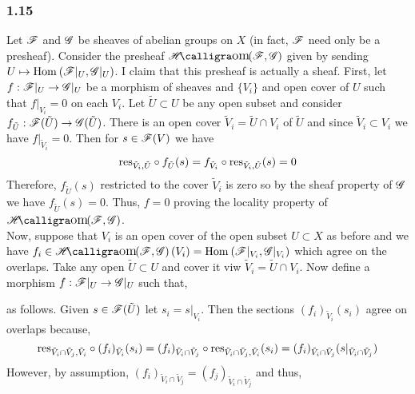\documentclass[12pt]{article}
\begin{document}
\subsubsection{1.15}

Let $\mathscr{F}$ and $\mathscr{G}$ be sheaves of abelian groups on $X$ (in fact, $\mathscr{F}$ need only be a presheaf). Consider the presheaf $\shHom{}{\F}{\G}$ given by sending $U \mapsto \text{Hom}_{}\left( \mathscr{F}|_U, \mathscr{G}|_U \right)$. I claim that this presheaf is actually a sheaf. First, let $f : \mathscr{F}|_U \to \mathscr{G}|_U$ be a morphism of sheaves and $\{ V_i \}$ and open cover of $U$ such that $f|_{V_i} = 0$ on each $V_i$. Let $\tilde{U} \subset U$ be any open subset and consider $f_{\tilde{U}} : \mathscr{F}(\tilde{U}) \to \mathscr{G}(\tilde{U})$. There is an open cover $\tilde{V}_i = \tilde{U} \cap V_i$ of $\tilde{U}$ and since $\tilde{V}_i \subset V_i$ we have $f|_{\tilde{V}_i} = 0$. Then for $s \in \mathscr{F}(V)$ we have \[ \mathrm{res}_{\tilde{V}_i, \tilde{U}} \circ f_{\tilde{U}}(s) = f_{\tilde{V}_i} \circ \mathrm{res}_{\tilde{V}_i, \tilde{U}}(s) = 0 \]
Therefore, $f_{\tilde{U}}(s)$ restricted to the cover $\tilde{V}_i$ is zero so by the sheaf property of $\mathscr{G}$ we have $f_{\tilde{U}}(s) = 0$. Thus, $f = 0$ proving the locality property of $\shHom{}{\F}{\G}$. 
\bigskip\\
Now, suppose that $V_i$ is an open cover of the open subset $U \subset X$ as before and we have $f_i \in \shHom{}{\F}{\G}(V_i) = \Hom{}{\F|_{V_i}}{\G|_{V_i}}$ which agree on the overlaps. Take any open $\tilde{U} \subset U$ and cover it viw $\tilde{V}_i = \tilde{U} \cap V_i$. Now define a morphism $f : \mathscr{F}|_U \to \mathscr{G}|_U$ such that,
\begin{center}
\end{center}
as follows. Given $s \in \mathscr{F}(\tilde{U})$ let $s_i = s |_{V_i}$. Then the sections $(f_i)_{\tilde{V}_i}(s_i)$ agree on overlaps because,
\[ \mathrm{res}_{\tilde{V}_i \cap \tilde{V}_j, \tilde{V}_i} \circ (f_i)_{\tilde{V}_i}(s_i) = (f_i)_{\tilde{V}_i \cap \tilde{V}_j} \circ \mathrm{res}_{\tilde{V}_i \cap \tilde{V}_j, \tilde{V}_i}(s_i) = (f_i)_{\tilde{V}_i \cap \tilde{V}_j}(s |_{\tilde{V}_i \cap \tilde{V}_j}) \]
However, by assumption, $(f_i)_{\tilde{V}_i \cap \tilde{V}_j} = (f_j)_{\tilde{V}_i \cap \tilde{V}_j}$ and thus,
\end{document}
